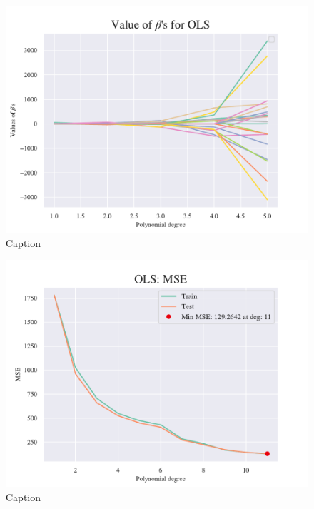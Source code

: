 \begin{figure}
    \centering
    \includegraphics[width=1\linewidth]{project_1/figures/figures_in_appendix/OLS_Betas_terrain.pdf}
    \caption{Caption}
    \label{fig:ref}
\end{figure}

\begin{figure}
    \centering
    \includegraphics[width=1\linewidth]{project_1/figures/figures_in_appendix/OLS_MSE_terrain.pdf}
    \caption{Caption}
    \label{fig:ref}
\end{figure}

